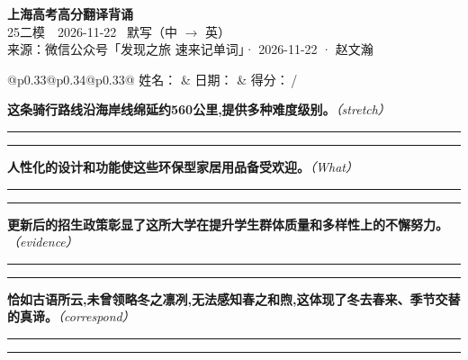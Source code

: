 \documentclass[11pt,a4paper]{article}
\newcommand{\num}[1]{\makebox[1.9em][r]{#1.}\hspace{0.3em}}
\newcommand{\wline}{\noindent\rule{\linewidth}{0.4pt}}
\newcommand{\prompt}[1]{\emph{\textcolor{tipblue}{\small（#1）}}}
\begin{document}
\pagestyle{plain}
\begin{center}
{\LARGE\bfseries 上海高考高分翻译背诵 }\\[0.25em]
{\large 25二模　2026-11-22 \quad\ 默写（中 $\to$ 英）}\\[0.35em]
{\footnotesize 来源：微信公众号「发现之旅 速来记单词」· 2026-11-22 · 赵文瀚}
\end{center}

\vspace{0.4em}
\noindent\begin{tabular}{@{}p{0.33\textwidth}@{}p{0.34\textwidth}@{}p{0.33\textwidth}@{}}
姓名：\underline{\hspace{2.0cm}} & 日期：\underline{\hspace{2.0cm}} & 得分：\underline{\hspace{1.4cm}}\,/ \\
\end{tabular}

\vspace{0.5em}

\vspace{0.8em}
\num{1}\textbf{这条骑行路线沿海岸线绵延约560公里,提供多种难度级别。}\prompt{stretch}

\vspace{0.3em}

\wline\vspace{0.3em}
\wline

\num{2}\textbf{人性化的设计和功能使这些环保型家居用品备受欢迎。}\prompt{What}

\vspace{0.3em}

\wline\vspace{0.3em}
\wline

\num{3}\textbf{更新后的招生政策彰显了这所大学在提升学生群体质量和多样性上的不懈努力。}\prompt{evidence}

\vspace{0.3em}

\wline\vspace{0.3em}
\wline

\num{4}\textbf{恰如古语所云,未曾领略冬之凛冽,无法感知春之和煦,这体现了冬去春来、季节交替的真谛。}\prompt{correspond}

\vspace{0.3em}

\wline\vspace{0.3em}
\wline
\end{document}
